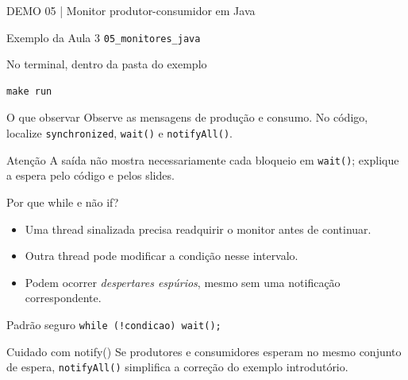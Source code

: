 \documentclass[aspectratio=169,11pt]{beamer}
\begin{document}
\begin{frame}[fragile]{DEMO 05 | Monitor produtor-consumidor em Java}
\small
\begin{block}{Exemplo da Aula 3}
\texttt{05\_monitores\_java}
\end{block}
\begin{block}{No terminal, dentro da pasta do exemplo}
\begin{verbatim}
make run
\end{verbatim}
\end{block}
\begin{exampleblock}{O que observar}
Observe as mensagens de produção e consumo. No código, localize \texttt{synchronized}, \texttt{wait()} e \texttt{notifyAll()}.
\end{exampleblock}
\begin{alertblock}{Atenção}
A saída não mostra necessariamente cada bloqueio em \texttt{wait()}; explique a espera pelo código e pelos slides.
\end{alertblock}
\end{frame}

\begin{frame}{Por que while e não if?}
\small
\begin{itemize}
\item Uma thread sinalizada precisa readquirir o monitor antes de continuar.
\item Outra thread pode modificar a condição nesse intervalo.
\item Podem ocorrer \emph{despertares espúrios}, mesmo sem uma notificação correspondente.
\end{itemize}
\begin{block}{Padrão seguro}
\texttt{while (!condicao) wait();}
\end{block}
\begin{alertblock}{Cuidado com notify()}
Se produtores e consumidores esperam no mesmo conjunto de espera, \texttt{notifyAll()} simplifica a correção do exemplo introdutório.
\end{alertblock}
\end{frame}
\end{document}
